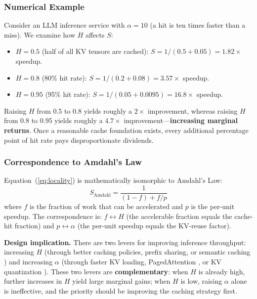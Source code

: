 \documentclass[11pt,a4paper]{article}
\begin{document}
\subsubsection{Numerical Example}

Consider an LLM inference service with $\alpha = 10$ (a hit is ten times faster than a miss). We examine how $H$ affects $S$:

\begin{itemize}[nosep]
\item $H = 0.5$ (half of all KV tensors are cached): $S = 1/(0.5 + 0.05) = 1.82\times$ speedup.
\item $H = 0.8$ (80\% hit rate): $S = 1/(0.2 + 0.08) = 3.57\times$ speedup.
\item $H = 0.95$ (95\% hit rate): $S = 1/(0.05 + 0.0095) = 16.8\times$ speedup.
\end{itemize}

Raising $H$ from 0.5 to 0.8 yields roughly a $2\times$ improvement, whereas raising $H$ from 0.8 to 0.95 yields roughly a $4.7\times$ improvement---\textbf{increasing marginal returns}. Once a reasonable cache foundation exists, every additional percentage point of hit rate pays disproportionate dividends.

\subsubsection{Correspondence to Amdahl's Law}

Equation~(\ref{eq:locality}) is mathematically isomorphic to Amdahl's Law:
\begin{equation}
S_{\mathrm{Amdahl}} = \frac{1}{(1-f) + f/p}
\end{equation}
where $f$ is the fraction of work that can be accelerated and $p$ is the per-unit speedup. The correspondence is: $f \leftrightarrow H$ (the accelerable fraction equals the cache-hit fraction) and $p \leftrightarrow \alpha$ (the per-unit speedup equals the KV-reuse factor).

\textbf{Design implication.} There are two levers for improving inference throughput: increasing $H$ (through better caching policies, prefix sharing, or semantic caching \cite{gim2024promptcache}) and increasing $\alpha$ (through faster KV loading, PagedAttention \cite{kwon2023pagedattention}, or KV quantization \cite{hooper2024kvquant}). These two levers are \textbf{complementary}: when $H$ is already high, further increases in $H$ yield large marginal gains; when $H$ is low, raising $\alpha$ alone is ineffective, and the priority should be improving the caching strategy first.
\end{document}

